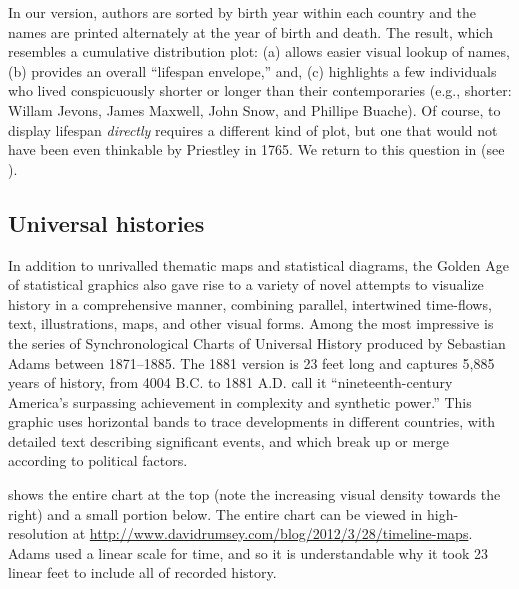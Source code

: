 In our version, authors are sorted by birth year within each country and the names are printed alternately at the year of birth and death. The result, which resembles a cumulative distribution plot: (a) allows easier visual lookup of names, (b) provides an overall ``lifespan envelope,'' and, (c) highlights a few individuals who lived conspicuously shorter or longer than their contemporaries (e.g., shorter: Willam Jevons,  James Maxwell, John Snow, and Phillipe Buache). Of course, to display lifespan \emph{directly} requires a different kind of plot, but one that would not have been even thinkable by Priestley in 1765.  We return to this question in  (see ).

\subsection{Universal histories}
In addition to unrivalled thematic maps and statistical diagrams, the Golden Age of statistical graphics also gave rise to a variety of novel attempts to visualize history in a comprehensive manner, combining parallel, intertwined time-flows, text, illustrations, maps, and other visual forms. Among the most impressive is the series of Synchronological Charts of Universal History produced by Sebastian Adams between 1871--1885. The 1881 version is 23 feet long and captures 5,885 years of history, from 4004 B.C. to 1881 A.D. \citet[p. 172]{RosenbergGrafton:2010} call it ``nineteenth-century America's surpassing achievement in complexity and synthetic power.''   This graphic uses horizontal bands to trace developments in different countries, with detailed text describing significant events, and which break up or merge according to political factors.

 shows the entire chart at the top (note the increasing visual density towards the right) and a small portion below.
The entire chart can be viewed in high-resolution at \url{http://www.davidrumsey.com/blog/2012/3/28/timeline-maps}.  Adams used a linear scale for time, and so it is understandable why it took 23 linear feet to include all of recorded history.  

